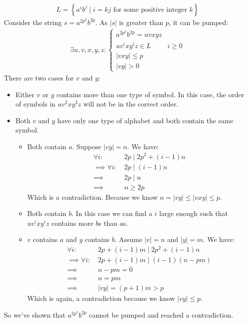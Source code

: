 \documentclass{article}
\numberwithin{equation}{subsection}
\newcommand{\abs}[1]{\vert #1\vert}
\begin{document}
\subsubsection{}
\begin{align*}
L=\left\{a^ib^j\mid i=kj \text{ for some positive integer } k\right\}
\end{align*}
Consider the string \(s=a^{2p^2}b^{2p}\).
As \(\abs{s}\) is greater than \(p\), it can be pumped:
\begin{align*}
\exists u,v,x,y,z:
\begin{cases}
a^{2p^2}b^{2p} = uvxyz&\\
uv^ixy^iz\in L & i\ge 0\\
\abs{vxy} \le p&\\
\abs{vy} > 0&
\end{cases}
\end{align*}
There are two cases for \(v\) and \(y\):
\begin{itemize}
\item Either \(v\) or \(y\) contains more than one type of symbol.
In this case, the order of symbols in \(uv^2xy^2z\) will not be in the correct order.
\item Both \(v\) and \(y\) have only one type of alphabet and both contain the same symbol.
\begin{itemize}
\item Both contain \(a\).
Suppose \(\abs{vy}=n\).
We have:
\begin{align*}
\forall i:\ &2p\mid 2p^2 + (i-1)n\\
\implies \forall i:\ &2p\mid (i-1)n\\
\implies &2p\mid n\\
\implies &n \ge 2p
\end{align*}
Which is a contradiction.
Because we know \(n=\abs{vy}\le \abs{vxy} \le  p\).
\item Both contain \(b\).
In this case we can find a \(i\) large enough such that \(uv^ixy^iz\) contains more \(b\)s than \(a\)s.
\item \(v\) contains \(a\) and \(y\) contains \(b\).
Assume \(\abs{v}=n\) and \(\abs{y}=m\). We have:
\begin{align*}
\forall i:\ &2p+(i-1)m\mid 2p^2 + (i-1)n\\
\implies \forall i:\ &2p+(i-1)m\mid (i-1) (n-pm)\\
\implies &n-pm = 0\\
\implies &n = pm\\
\implies &\abs{vy} = (p+1)m > p
\end{align*}
Which is again, a contradiction because we know \(\abs{vy} \le p\).
\end{itemize}
\end{itemize}
So we've shown that \(a^{2p^2}b^{2p}\) cannot be pumped and reached a contradiction.
\end{document}
